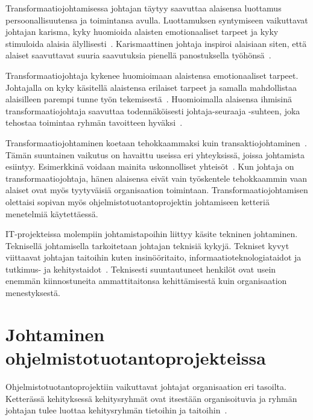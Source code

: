 \documentclass[finnish]{tktltiki2}
\theoremstyle{definition}
\theoremstyle{remark}
\begin{document}
Transformaatiojohtamisessa johtajan täytyy saavuttaa alaisensa luottamus persoonallisuutensa ja toimintansa avulla. Luottamuksen syntymiseen vaikuttavat johtajan karisma, kyky huomioida alaisten emotionaaliset tarpeet ja kyky stimuloida alaisia älyllisesti~\cite{bass1990transactional}. Karismaattinen johtaja inspiroi alaisiaan siten, että alaiset saavuttavat suuria saavutuksia pienellä panostuksella työhönsä~\cite{bass1990transactional}.

Transformaatiojohtaja kykenee huomioimaan alaistensa emotionaaliset tarpeet. Johtajalla on kyky käsitellä alaistensa erilaiset tarpeet ja samalla mahdollistaa alaisilleen parempi tunne työn tekemisestä~\cite{palmer2001emotional}. Huomioimalla alaisensa ihmisinä transformaatiojohtaja saavuttaa todennäköisesti johtaja-seuraaja -suhteen, joka tehostaa toimintaa ryhmän tavoitteen hyväksi~\cite{raccoon2006leadership}.

Transformaatiojohtaminen koetaan tehokkaammaksi kuin transaktiojohtaminen~\cite{palmer2001emotional}. Tämän suuntainen vaikutus on havaittu useissa eri yhteyksissä, joissa johtamista esiintyy. Esimerkkinä voidaan mainita uskonnolliset yhteisöt~\cite{bass1990transactional}. Kun johtaja on transformaatiojohtaja, hänen alaisensa eivät vain työskentele tehokkaammin vaan alaiset ovat myös tyytyväisiä organisaation toimintaan. Transformaatiojohtamisen olettaisi sopivan myös ohjelmistotuotantoprojektin johtamiseen ketteriä menetelmiä käytettäessä.

IT-projekteissa molempiin johtamistapoihin liittyy käsite tekninen johtaminen. Teknisellä johtamisella tarkoitetaan johtajan teknisiä kykyjä. Tekniset kyvyt viittaavat johtajan taitoihin kuten insinööritaito, informaatioteknologiataidot ja tutkimus- ja kehitystaidot~\cite{thite2000leadership}. Teknisesti suuntautuneet henkilöt ovat usein enemmän kiinnostuneita ammattitaitonsa kehittämisestä kuin organisaation menestyksestä. 

   



  


\section{Johtaminen ohjelmistotuotantoprojekteissa}

Ohjelmistotuotantoprojektiin vaikuttavat johtajat organisaation eri tasoilta. Ketterässä kehityksessä kehitysryhmät ovat  itsestään organisoituvia ja ryhmän johtajan tulee luottaa kehitysryhmän tietoihin ja taitoihin~\cite{fowler2001agile}.
\end{document}
